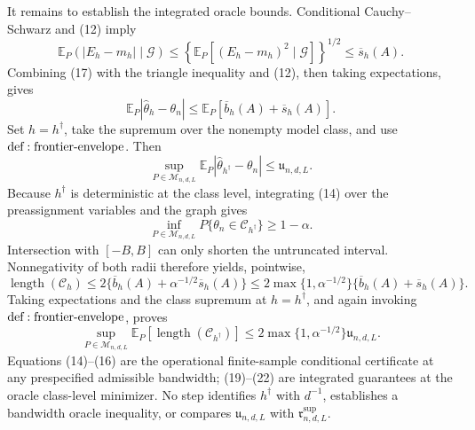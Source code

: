 It remains to establish the integrated oracle bounds.  Conditional Cauchy--Schwarz and (12) imply
\[
 \mathbb E_P(|E_h-m_h|\mid\mathcal G)
 \leq
 \left\{\mathbb E_P[(E_h-m_h)^2\mid\mathcal G]\right\}^{1/2}
 \leq\overline s_h(A).
\tag{17}
\]
Combining (17) with the triangle inequality and (12), then taking expectations, gives
\[
 \mathbb E_P|\widehat\theta_h-\theta_n|
 \leq\mathbb E_P[\overline b_h(A)+\overline s_h(A)].
\tag{18}
\]
Set \(h=h^\dagger\), take the supremum over the nonempty model class, and use \({\rm def:frontier\text{-}envelope}\).  Then
\[
 \sup_{P\in\mathcal M_{n,d,L}}
 \mathbb E_P|\widehat\theta_{h^\dagger}-\theta_n|
 \leq\mathfrak u_{n,d,L}.
\tag{19}
\]
Because \(h^\dagger\) is deterministic at the class level, integrating (14) over the preassignment variables and the graph gives
\[
 \inf_{P\in\mathcal M_{n,d,L}}
 P\{\theta_n\in\mathcal C_{h^\dagger}\}\geq1-\alpha.
\tag{20}
\]
Intersection with \([-B,B]\) can only shorten the untruncated interval.  Nonnegativity of both radii therefore yields, pointwise,
\[
 \operatorname{length}(\mathcal C_h)
 \leq2\{\overline b_h(A)+\alpha^{-1/2}\overline s_h(A)\}
 \leq2\max\{1,\alpha^{-1/2}\}
       \{\overline b_h(A)+\overline s_h(A)\}.
\tag{21}
\]
Taking expectations and the class supremum at \(h=h^\dagger\), and again invoking \({\rm def:frontier\text{-}envelope}\), proves
\[
 \sup_{P\in\mathcal M_{n,d,L}}
 \mathbb E_P[\operatorname{length}(\mathcal C_{h^\dagger})]
 \leq2\max\{1,\alpha^{-1/2}\}\mathfrak u_{n,d,L}.
\tag{22}
\]
Equations (14)--(16) are the operational finite-sample conditional certificate at any prespecified admissible bandwidth; (19)--(22) are integrated guarantees at the oracle class-level minimizer.  No step identifies \(h^\dagger\) with \(d^{-1}\), establishes a bandwidth oracle inequality, or compares \(\mathfrak u_{n,d,L}\) with \(\mathfrak r^{\mathrm{sup}}_{n,d,L}\).